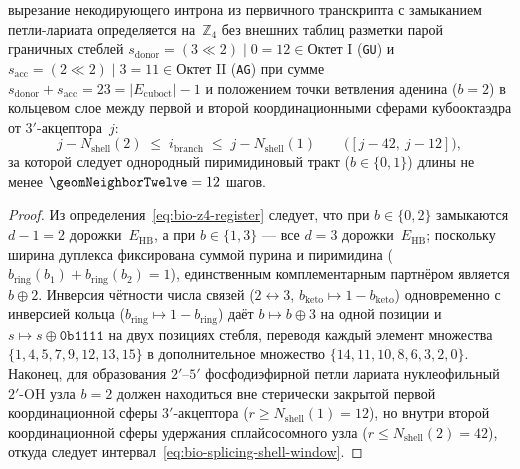 \begin{theorem}
\begin{enumerate}[leftmargin=*]
  вырезание некодирующего интрона из первичного транскрипта с замыканием петли-лариата определяется на~$\mathbb{Z}_4$ без внешних таблиц разметки парой граничных стеблей $s_{\mathrm{donor}} = (3\ll 2)\mid 0 = 12 \in \text{Октет I}$ (\texttt{GU}) и $s_{\mathrm{acc}} = (2\ll 2)\mid 3 = 11 \in \text{Октет II}$ (\texttt{AG}) при сумме $s_{\mathrm{donor}} + s_{\mathrm{acc}} = 23 = |E_{\mathrm{cuboct}}| - 1$ и положением точки ветвления аденина ($b = 2$) в кольцевом слое между первой и второй координационными сферами кубооктаэдра от $3'$-акцептора~$j$:
  \begin{equation}
  \label{eq:bio-splicing-shell-window}
    j - N_{\mathrm{shell}}(2) \;\le\; i_{\mathrm{branch}} \;\le\; j - N_{\mathrm{shell}}(1)
    \qquad\bigl([j - 42,\ j - 12]\bigr),
  \end{equation}
  за которой следует однородный пиримидиновый тракт ($b\in\{0,1\}$) длины не менее $\geomNeighborTwelve = 12$ шагов.
\end{enumerate}
\end{theorem}

\begin{proof}
Из определения~\eqref{eq:bio-z4-register} следует, что при $b\in\{0,2\}$ замыкаются $d-1=2$ дорожки~$E_{\mathrm{HB}}$, а при $b\in\{1,3\}$ --- все $d=3$ дорожки~$E_{\mathrm{HB}}$; поскольку ширина дуплекса фиксирована суммой пурина и пиримидина ($b_{\mathrm{ring}}(b_1) + b_{\mathrm{ring}}(b_2) = 1$), единственным комплементарным партнёром является $b\oplus 2$.
Инверсия чётности числа связей ($2\leftrightarrow 3$, $b_{\mathrm{keto}}\mapsto 1-b_{\mathrm{keto}}$) одновременно с инверсией кольца ($b_{\mathrm{ring}}\mapsto 1-b_{\mathrm{ring}}$) даёт $b\mapsto b\oplus 3$ на одной позиции и $s\mapsto s\oplus\texttt{0b1111}$ на двух позициях стебля, переводя каждый элемент множества $\{1,4,5,7,9,12,13,15\}$ в дополнительное множество $\{14,11,10,8,6,3,2,0\}$.
Наконец, для образования $2'\text{--}5'$ фосфодиэфирной петли лариата нуклеофильный $2'\text{-OH}$ узла $b=2$ должен находиться вне стерически закрытой первой координационной сферы $3'$-акцептора ($r \ge N_{\mathrm{shell}}(1) = 12$), но внутри второй координационной сферы удержания сплайсосомного узла ($r \le N_{\mathrm{shell}}(2) = 42$), откуда следует интервал~\eqref{eq:bio-splicing-shell-window}.
\end{proof}


